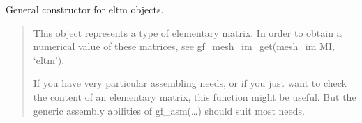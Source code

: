 \documentclass[a4paper,11pt,english]{sphinxmanual}
\begin{document}
\begin{sphinxVerbatim}[commandchars=\\\{\}]
    
    
    
  
  
  
      
\end{sphinxVerbatim}


General constructor for eltm objects.
\begin{quote}

This object represents a type of elementary matrix. In order to obtain a
numerical value of these matrices, see gf\_mesh\_im\_get(mesh\_im MI, ‘eltm’).

If you have very particular assembling needs, or if you just want to check
the content of an elementary matrix, this function might be useful. But
the generic assembly abilities of gf\_asm(…) should suit most needs.
\end{quote}
\end{document}

